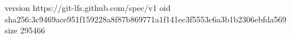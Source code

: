 version https://git-lfs.github.com/spec/v1
oid sha256:3c9469ace951f159228a8f87b869771a1f141ec3f5553c6a3b1b2306ebfda569
size 295466
